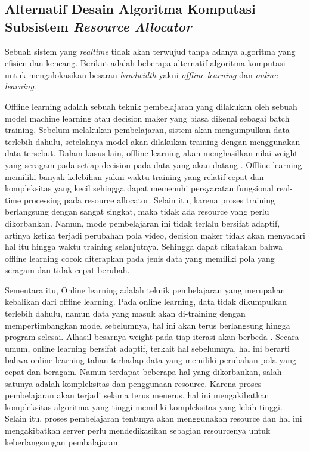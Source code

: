    \subsection{Alternatif Desain Algoritma Komputasi Subsistem \textit{Resource Allocator}}
        Sebuah sistem yang \textit{realtime} tidak akan terwujud tanpa adanya algoritma yang efisien dan kencang. 
        Berikut adalah beberapa alternatif algoritma komputasi untuk mengalokasikan besaran \textit{bandwidth}
        yakni \textit{offline learning} dan \textit{online learning}.

        Offline learning adalah sebuah teknik pembelajaran yang dilakukan oleh sebuah model machine
        learning atau decision maker yang biasa dikenal sebagai batch training. Sebelum melakukan
        pembelajaran, sistem akan mengumpulkan data terlebih dahulu, setelahnya model akan
        dilakukan training dengan menggunakan data tersebut. Dalam kasus lain, offline learning akan
        menghasilkan nilai weight yang seragam pada setiap decision pada data yang akan datang \citep{offlineOnline}.
        Offline learning memiliki banyak kelebihan yakni waktu training yang relatif cepat dan
        kompleksitas yang kecil sehingga dapat memenuhi persyaratan fungsional real-time processing
        pada resource allocator. Selain itu, karena proses training berlangsung dengan sangat singkat, maka tidak ada resource yang perlu dikorbankan. 
        Namun, mode pembelajaran ini tidak terlalu bersifat adaptif, artinya ketika terjadi perubahan pola video,
        decision maker tidak akan menyadari hal itu hingga waktu training selanjutnya. Sehingga dapat dikatakan bahwa 
        offline learning cocok diterapkan pada jenis data yang memiliki pola yang seragam dan tidak cepat berubah.

        Sementara itu, Online learning adalah teknik pembelajaran yang merupakan kebalikan dari offline learning.
        Pada online learning, data tidak dikumpulkan terlebih dahulu, namun data yang masuk akan di-training dengan mempertimbangkan model sebelumnya, hal
        ini akan terus berlangsung hingga program selesai. Alhasil besarnya weight pada tiap iterasi
        akan berbeda \citep{online}. Secara umum, online learning bersifat adaptif, terkait hal sebelumnya, hal ini berarti bahwa online learning 
        tahan terhadap data yang memiliki perubahan pola yang cepat dan beragam. Namun terdapat beberapa hal yang dikorbankan, salah satunya adalah kompleksitas
        dan penggunaan resource. Karena proses pembelajaran akan terjadi selama terus menerus, hal ini mengakibatkan kompleksitas algoritma yang tinggi
        memiliki kompleksitas yang lebih tinggi. Selain itu, proses pembelajaran tentunya akan menggunakan resource dan hal ini mengakibatkan server perlu 
        mendedikasikan sebagian resourcenya untuk keberlangsungan pembalajaran.

